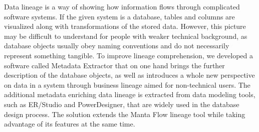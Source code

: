 \documentclass[12pt]{report}
\begin{document}
Data lineage is a way of showing how information flows through complicated software systems. If the given system is a database, tables and columns are visualized along with transformations of the stored data. However, this picture may be difficult to understand for people with weaker technical background, as database objects usually obey naming conventions and do not necessarily represent something tangible. To improve lineage comprehension, we developed a software called Metadata Extractor that on one hand brings the further description of the database objects, as well as introduces a whole new perspective on data in a system through business lineage aimed for non-technical users. The additional metadata enriching data lineage is extracted from data modeling tools, such as ER/Studio and PowerDesigner, that are widely used in the database design process. The solution extends the Manta Flow lineage tool while taking advantage of its features at the same time.
\end{document}
